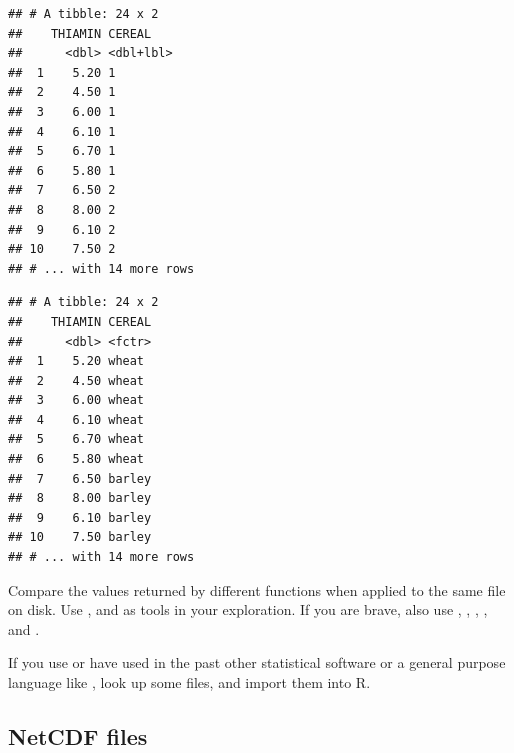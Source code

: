\documentclass[krantz2,ChapterTOCs]{krantz}\usepackage{knitr}
\begin{document}
\begin{knitrout}\footnotesize
{}\color{fgcolor}\begin{kframe}
\begin{alltt}
 \hlkwb{<-} \hlstd{(} \hlstd{=} \hlstd{)}
\end{alltt}
\begin{verbatim}
## # A tibble: 24 x 2
##    THIAMIN CEREAL   
##      <dbl> <dbl+lbl>
##  1    5.20 1        
##  2    4.50 1        
##  3    6.00 1        
##  4    6.10 1        
##  5    6.70 1        
##  6    5.80 1        
##  7    6.50 2        
##  8    8.00 2        
##  9    6.10 2        
## 10    7.50 2        
## # ... with 14 more rows
\end{verbatim}
\begin{alltt}
 \hlkwb{<-} 
\end{alltt}
\begin{verbatim}
## # A tibble: 24 x 2
##    THIAMIN CEREAL
##      <dbl> <fctr>
##  1    5.20 wheat 
##  2    4.50 wheat 
##  3    6.00 wheat 
##  4    6.10 wheat 
##  5    6.70 wheat 
##  6    5.80 wheat 
##  7    6.50 barley
##  8    8.00 barley
##  9    6.10 barley
## 10    7.50 barley
## # ... with 14 more rows
\end{verbatim}
\end{kframe}
\end{knitrout}

\begin{playground}
Compare the values returned by different  functions when applied to the same file on disk. Use ,  and  as tools in your exploration. If you are brave, also use , , , ,  and .
\end{playground}

\begin{playground}
If you use or have used in the past other statistical software or a general purpose language like , look up some files, and import them into R.
\end{playground}

\subsection{NetCDF files}
\end{document}
